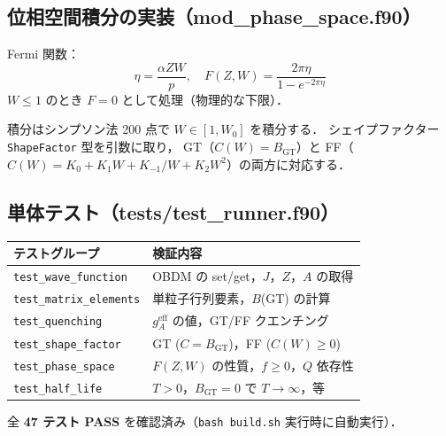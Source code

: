 \documentclass[12pt,a4paper]{ltjsarticle}
\begin{document}
\subsection{位相空間積分の実装（mod\_phase\_space.f90）}

Fermi 関数：
\begin{equation}
  \eta = \frac{\alpha Z W}{p},\quad
  F(Z,W) = \frac{2\pi\eta}{1 - e^{-2\pi\eta}}
\end{equation}
$W \leq 1$ のとき $F = 0$ として処理（物理的な下限）．

積分はシンプソン法 200 点で $W \in [1, W_0]$ を積分する．
シェイプファクター \texttt{ShapeFactor} 型を引数に取り，
GT（$C(W) = B_\text{GT}$）と FF（$C(W) = K_0 + K_1 W + K_{-1}/W + K_2 W^2$）の両方に対応する．

\subsection{単体テスト（tests/test\_runner.f90）}

\begin{center}
\begin{tabular}{ll}
\toprule
テストグループ & 検証内容 \\
\midrule
\texttt{test\_wave\_function} & OBDM の set/get，$J$，$Z$，$A$ の取得 \\
\texttt{test\_matrix\_elements} & 単粒子行列要素，$B$(GT) の計算 \\
\texttt{test\_quenching} & $g_A^\text{eff}$ の値，GT/FF クエンチング \\
\texttt{test\_shape\_factor} & GT ($C = B_\text{GT}$)，FF ($C(W) \geq 0$) \\
\texttt{test\_phase\_space} & $F(Z,W)$ の性質，$f \geq 0$，$Q$ 依存性 \\
\texttt{test\_half\_life} & $T > 0$，$B_\text{GT} = 0$ で $T \to \infty$，等 \\
\bottomrule
\end{tabular}
\end{center}

全 \textbf{47 テスト PASS} を確認済み（\texttt{bash build.sh} 実行時に自動実行）．
\end{document}
